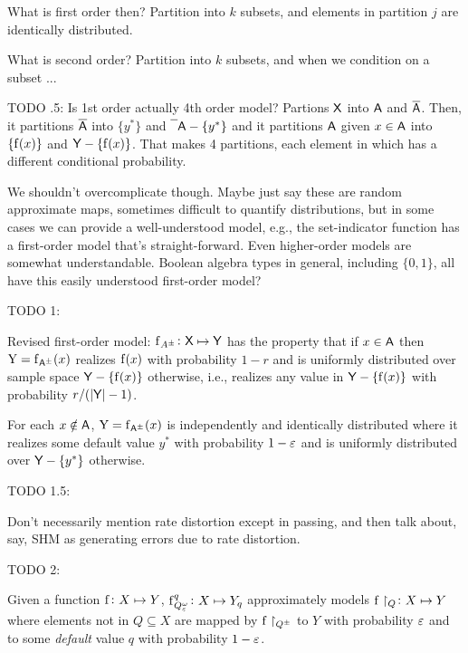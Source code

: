 \documentclass[11pt,final,hidelinks]{article}
\begin{document}
What is first order then? Partition into $k$ subsets, and elements in partition $j$ are identically distributed.

What is second order? Partition into $k$ subsets, and when we condition on a subset ...

TODO .5: 
Is 1st order actually 4th order model? Partions $\Set{X}$ into $\Set{A}$ and $\SetComplement[\Set{A}]$. Then, it partitions $\SetComplement[\Set{A}]$ into $\{y^*\}$ and $\SetComplement{\Set{A}} - \{y^*\}$ and it partitions $\Set{A}$ given $x \in \Set{A}$ into $\{\Fun{f}(x)\}$ and $\Set{Y} - \{\Fun{f}(x)\}$. That makes 4 partitions, each element in which has a different conditional probability.

We shouldn't overcomplicate though. Maybe just say these are random approximate maps, sometimes difficult to quantify distributions, but in some cases we can provide a well-understood model, e.g., the set-indicator function has a first-order model that's straight-forward. Even higher-order models are somewhat understandable. Boolean algebra types in general, including $\{0,1\}$, all have this easily understood first-order model?



TODO 1:

Revised first-order model: $\Fun{f}_{\AT{A}} \colon \Set{X} \mapsto \Set{Y}$ has the property that if $x \in \Set{A}$ then $\RV{Y} = \Fun{f}_{\AT{\Set{A}}}(x)$ realizes $\Fun{f}(x)$ with probability $1-r$ and is uniformly distributed over sample space $\Set{Y} - \{\Fun{f}(x)\}$ otherwise, i.e., realizes any value in $\Set{Y} - \{\Fun{f}(x)\}$ with probability $r / (\Card{\Set{Y}}-1)$.

For each $x \notin \Set{A}$, $\RV{Y} = \Fun{f}_{\AT{\Set{A}}}(x)$ is independently and identically distributed where it realizes some default value $y^*$ with probability $1-\varepsilon$ and is uniformly distributed over $\Set{Y} - \{y^*\}$ otherwise.

TODO 1.5:

Don't necessarily mention rate distortion except in passing, and then talk about, say, SHM as generating errors due to rate distortion.


TODO 2:

Given a function $\Fun{f} \colon X \mapsto Y$, $\Fun{f}[\AT{Q}[\fprate][\fnrate]][q] \colon X \mapsto Y_q$ approximately models $\Fun{f} \restriction_{Q} \colon X \mapsto Y$ where elements not in $Q \subseteq X$ are mapped by $\Fun{f} \restriction_{\AT{Q}}$ to $Y$ with probability $\varepsilon$ and to some \emph{default} value $q$ with probability $1-\varepsilon$.
\end{document}

